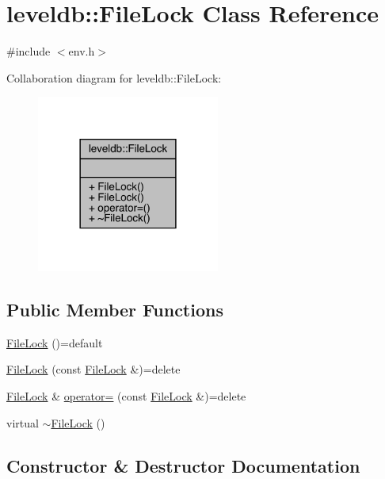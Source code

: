 \hypertarget{classleveldb_1_1_file_lock}{}\section{leveldb\+::File\+Lock Class Reference}
\label{classleveldb_1_1_file_lock}


{\ttfamily \#include $<$env.\+h$>$}



Collaboration diagram for leveldb\+::File\+Lock\+:
\nopagebreak
\begin{figure}[H]
\begin{center}
\leavevmode
\includegraphics[width=170pt]{classleveldb_1_1_file_lock__coll__graph}
\end{center}
\end{figure}
\subsection*{Public Member Functions}
\begin{DoxyCompactItemize}
\item 
\mbox{\hyperlink{classleveldb_1_1_file_lock_a56a9f4f9b7c3ac92a0894f19374fb912}{File\+Lock}} ()=default
\item 
\mbox{\hyperlink{classleveldb_1_1_file_lock_aebe79221ce346725e9ae8c766f3d7982}{File\+Lock}} (const \mbox{\hyperlink{classleveldb_1_1_file_lock}{File\+Lock}} \&)=delete
\item 
\mbox{\hyperlink{classleveldb_1_1_file_lock}{File\+Lock}} \& \mbox{\hyperlink{classleveldb_1_1_file_lock_a3e98643c03cfb4176577384252c2ad5f}{operator=}} (const \mbox{\hyperlink{classleveldb_1_1_file_lock}{File\+Lock}} \&)=delete
\item 
virtual \mbox{\hyperlink{classleveldb_1_1_file_lock_a16bc5872cee9d90f93a424a5fe60993f}{$\sim$\+File\+Lock}} ()
\end{DoxyCompactItemize}


\subsection{Constructor \& Destructor Documentation}
\mbox{\label{classleveldb_1_1_file_lock_a56a9f4f9b7c3ac92a0894f19374fb912}} 
